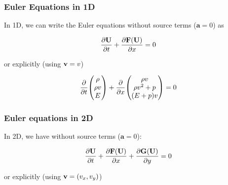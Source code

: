 \subsubsection{Euler Equations in 1D}

In 1D, we can write the Euler equations without source terms ($\mathbf{a} = 0$)
as

\begin{align}
    \frac{\partial  \mathbf{U} }{\partial t} + \frac{\partial \mathbf{F}(\mathbf{U})}{\partial x} = 0
\end{align}

or explicitly (using $\mathbf{v} = v$)


\begin{align}
	\frac{\partial}{\partial t}{ 
		\begin{pmatrix}
			\rho \\ \rho v \\ E
		\end{pmatrix}
		}
	+ \frac{\partial}{\partial x} {
		\begin{pmatrix}
			\rho v\\
			\rho v^2  + p\\
			(E + p) v
		\end{pmatrix}
	} = 0
\end{align}




\subsubsection{Euler equations in 2D}

In 2D, we have without source terms ($\mathbf{a} = 0$):



\begin{align}
\frac{\partial  \mathbf{U} }{\partial t} + \frac{\partial \mathbf{F}(\mathbf{U})}{\partial x} + \frac{\partial \mathbf{G}(\mathbf{U})}{\partial y} = 0
\label{eq:euler-dimensional-split}
\end{align}

or explicitly (using $\mathbf{v} = (v_x, v_y)$)

